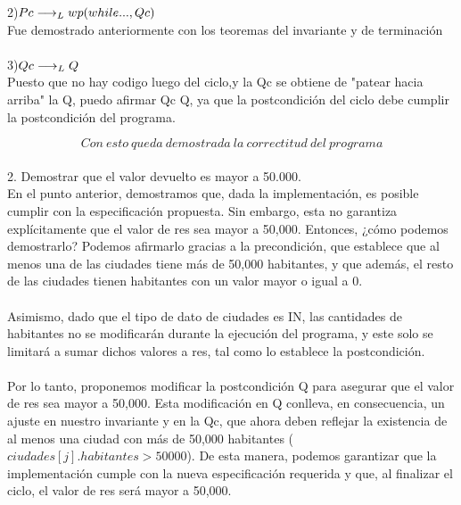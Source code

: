 \documentclass[10pt,a4paper]{article}
\begin{document}
2)$Pc \longrightarrow _L wp(while..., Qc)$ \\ \hspace{0.5cm}
Fue demostrado anteriormente con los teoremas del invariante y de terminación \\ \\
3)$ Qc \longrightarrow _L Q$\\ \hspace{0.5cm}
Puesto que no hay codigo luego del ciclo,y la Qc se obtiene de "patear hacia arriba" la Q, puedo afirmar Qc \implica Q, ya que la postcondición del ciclo debe cumplir la postcondición del programa.

\[Con \ esto\ queda\ demostrada\ la\ correctitud\ del\ programa\]
\vspace{2cm}\\
2. Demostrar que el valor devuelto es mayor a 50.000.
\vspace{0.3cm}\\
En el punto anterior, demostramos que, dada la implementación, es posible cumplir con la especificación propuesta. Sin embargo, esta no garantiza explícitamente que el valor de res sea mayor a 50,000. Entonces, ¿cómo podemos demostrarlo? Podemos afirmarlo gracias a la precondición, que establece que al menos una de las ciudades tiene más de 50,000 habitantes, y que además, el resto de las ciudades tienen habitantes con un valor mayor o igual a 0.\\ \\
Asimismo, dado que el tipo de dato de ciudades es IN, las cantidades de habitantes no se modificarán durante la ejecución del programa, y este solo se limitará a sumar dichos valores a res, tal como lo establece la postcondición.\\ \\
Por lo tanto, proponemos modificar la postcondición Q para asegurar que el valor de res sea mayor a 50,000. Esta modificación en Q conlleva, en consecuencia, un ajuste en nuestro invariante y en la Qc, que ahora deben reflejar la existencia de al menos una ciudad con más de 50,000 habitantes ($ciudades[j].habitantes > 50000$). De esta manera, podemos garantizar que la implementación cumple con la nueva especificación requerida y que, al finalizar el ciclo, el valor de res será mayor a 50,000. \\ \\
\end{document}
